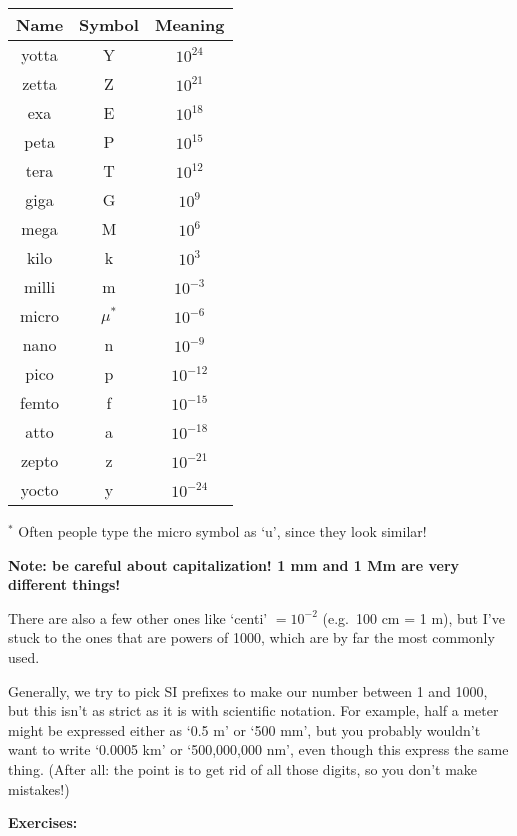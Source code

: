 \documentclass[12pt, letterpaper]{article}
\begin{document}
\begin{centering}
	
\begin{tabular}{ccc}
Name & Symbol & Meaning\\
\hline
yotta & Y & $10^{24}$\\
zetta & Z & $10^{21}$\\
exa & E & $10^{18}$\\
peta & P & $10^{15}$\\
tera & T & $10^{12}$\\
giga & G & $10^{9}$\\
mega & M & $10^{6}$\\
kilo & k & $10^{3}$\\
\hline
milli & m & $10^{-3}$\\
micro & $\mu^*$& $10^{-6}$\\
nano & n & $10^{-9}$\\
pico & p & $10^{-12}$\\
femto & f & $10^{-15}$\\
atto & a & $10^{-18}$\\
zepto & z & $10^{-21}$\\
yocto & y & $10^{-24}$\\
\end{tabular}

$^*$ Often people type the micro symbol as `u', since they look similar!

\end{centering}



\textbf{Note: be careful about capitalization!  1 mm and 1 Mm are very different things!}

There are also a few other ones like `centi' $=10^{-2}$ (e.g.~100 cm = 1 m), but I've stuck to the ones that are powers of 1000, which are by far the most commonly used.

Generally, we try to pick SI prefixes to make our number between 1 and 1000, but this isn't as strict as it is with scientific notation.
For example, half a meter might be expressed either as `0.5 m' or `500 mm', but you probably wouldn't want to write `0.0005 km' or `500,000,000 nm', even though this express the same thing.
(After all: the point is to get rid of all those digits, so you don't make mistakes!)



\textbf{Exercises:}
\end{document}
